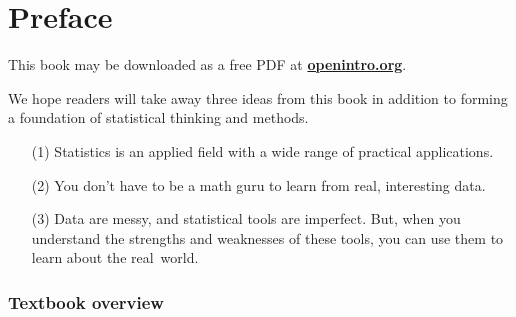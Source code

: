 \chapter*{Preface\vspace{-6mm}}

\vspace{3mm}

\noindent 
This book may be downloaded as a free PDF at \href{http://www.openintro.org}{\color{black}\textbf{openintro.org}}.
\vspace{3mm}

\noindent We hope readers will take away three ideas from this book in addition to forming a foundation of statistical thinking and methods.\vspace{-1mm}
\begin{enumerate}
\setlength{\itemsep}{0mm}
\item[(1)] Statistics is an applied field with a wide range of practical applications.
\item[(2)] You don't have to be a math guru to learn from real, interesting data.
\item[(3)] Data are messy, and statistical tools are imperfect. But, when you understand the strengths and weaknesses of these tools, you can use them to learn about the real~world.
\end{enumerate}


\subsection*{Textbook overview}

